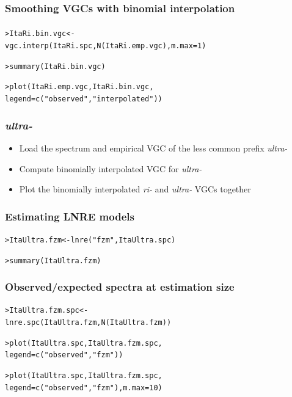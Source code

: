\documentclass[t]{beamer} %
\begin{document}
\begin{frame}[fragile]
  \frametitle{Smoothing VGCs with binomial interpolation}
  \framesubtitle{\citep[for details, see][Sec. 2.6.1]{Baayen:01}}

\begin{alltt}
> ItaRi.bin.vgc <- 
  vgc.interp(ItaRi.spc, N(ItaRi.emp.vgc), m.max=1)

> summary(ItaRi.bin.vgc)

> plot(ItaRi.emp.vgc, ItaRi.bin.vgc,
       legend=c("observed", "interpolated"))
\end{alltt}


\end{frame}


\begin{frame}
  \frametitle{\emph{ultra-}}

  \begin{itemize}
  \item Load the spectrum and empirical VGC of the less common prefix \emph{ultra-}
  \item Compute binomially interpolated VGC for \emph{ultra-}
  \item Plot the binomially interpolated \emph{ri-} and \emph{ultra-}
    VGCs together
  \end{itemize}

\end{frame}


\begin{frame}[fragile]
  \frametitle{Estimating LNRE models}

\begin{alltt}

> ItaUltra.fzm <- lnre("fzm", ItaUltra.spc)

> summary(ItaUltra.fzm)
\end{alltt}

\end{frame}


\begin{frame}[fragile]
  \frametitle{Observed/expected spectra at estimation size}
\begin{alltt}
> ItaUltra.fzm.spc <- 
  lnre.spc(ItaUltra.fzm, N(ItaUltra.fzm))

> plot(ItaUltra.spc, ItaUltra.fzm.spc,
       legend=c("observed", "fzm"))

> plot(ItaUltra.spc, ItaUltra.fzm.spc, 
       legend=c("observed", "fzm"), m.max=10)
\end{alltt}
\end{frame}
\end{document}
